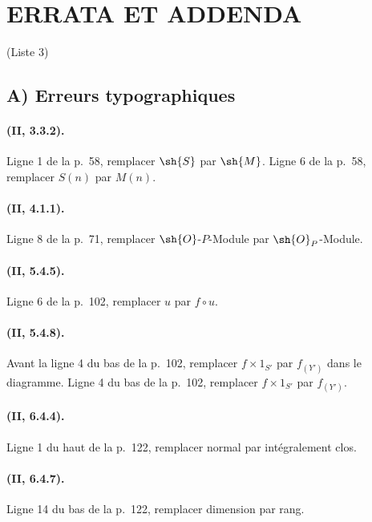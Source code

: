 \clearpage
{}
{}
\section*{ERRATA ET ADDENDA}
\begin{center}\large (Liste 3)\end{center}

\subsection*{A) Erreurs typographiques}

\paragraph{(II, 3.3.2).}
Ligne 1 de la p.~58, remplacer $\sh{S}$ par $\sh{M}$. Ligne 6 de la
p.~58, remplacer $S(n)$ par $M(n)$.

\paragraph{(II, 4.1.1).}
Ligne 8 de la p.~71, remplacer $\sh{O}$-$P$-Module par
$\sh{O}_P$-Module.

\paragraph{(II, 5.4.5).}
Ligne 6 de la p.~102, remplacer $u$ par $f\circ u$.

\paragraph{(II, 5.4.8).}
Avant la ligne 4 du bas de la p.~102, remplacer $f\times1_{S'}$ par
$f_{(Y')}$ dans le diagramme. Ligne 4 du bas de la p.~102, remplacer
$f\times1_{S'}$ par $f_{(Y')}$.

\paragraph{(II, 6.4.4).}
Ligne 1 du haut de la p.~122, remplacer normal par intégralement clos.

\paragraph{(II, 6.4.7).}
Ligne 14 du bas de la p.~122, remplacer dimension par rang.

